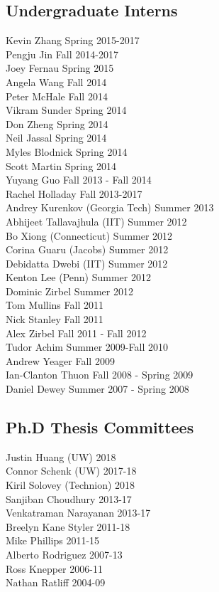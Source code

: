 \subsection{Undergraduate Interns}
\noindent
Kevin Zhang  \hfill Spring 2015-2017\\
Pengju Jin  \hfill Fall 2014-2017\\
Joey Fernau  \hfill Spring 2015\\
Angela Wang  \hfill Fall 2014\\
Peter McHale  \hfill Fall 2014\\
Vikram Sunder  \hfill Spring 2014\\
Don Zheng  \hfill Spring 2014\\
Neil Jassal  \hfill Spring 2014\\
Myles Blodnick  \hfill Spring 2014\\
Scott Martin  \hfill Spring 2014\\
Yuyang Guo  \hfill Fall 2013 - Fall 2014\\
Rachel Holladay  \hfill Fall 2013-2017\\
Andrey Kurenkov (Georgia Tech) \hfill Summer 2013\\ 
Abhijeet Tallavajhula (IIT) \hfill Summer 2012\\
Bo Xiong (Connecticut) \hfill Summer 2012\\
Corina Guaru (Jacobs) \hfill Summer 2012\\
Debidatta Dwebi (IIT) \hfill Summer 2012\\
Kenton Lee (Penn) \hfill Summer 2012\\
Dominic Zirbel  \hfill Summer 2012\\
Tom Mullins  \hfill Fall 2011\\
Nick Stanley  \hfill Fall 2011\\
Alex Zirbel  \hfill Fall 2011 - Fall 2012\\
Tudor Achim  \hfill Summer 2009-Fall 2010\\
Andrew Yeager  \hfill Fall 2009\\
Ian-Clanton Thuon  \hfill Fall 2008 - Spring 2009\\
Daniel Dewey  \hfill Summer 2007 - Spring 2008\\

\subsection{Ph.D Thesis Committees}
\noindent
Justin Huang (UW) \hfill 2018\\
Connor Schenk (UW) \hfill 2017-18\\
Kiril Solovey (Technion) \hfill 2018\\
Sanjiban Choudhury \hfill 2013-17\\
Venkatraman Narayanan \hfill 2013-17\\
Breelyn Kane Styler  \hfill 2011-18\\ 
Mike Phillips  \hfill 2011-15\\
Alberto Rodriguez  \hfill 2007-13\\
Ross Knepper  \hfill 2006-11\\
Nathan Ratliff  \hfill 2004-09\\
